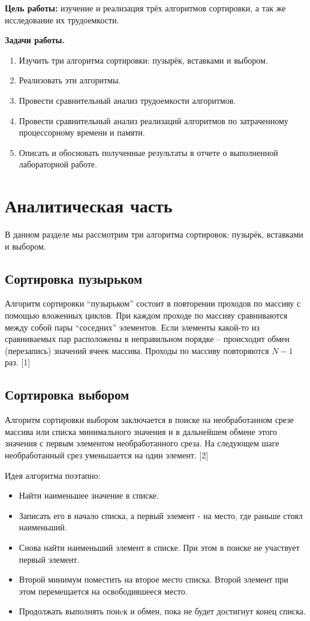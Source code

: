 \documentclass[a4paper,14pt, unknownkeysallowed]{extreport}
\begin{document}
\textbf{Цель работы:} изучение и реализация трёх алгоритмов сортировки, а так же исследование их трудоемкости. \newline

\textbf{Задачи работы.}
\begin{enumerate}
	\item Изучить три алгоритма сортировки: пузырёк, вставками и выбором.
    \item Реализовать эти алгоритмы.
    \item Провести сравнительный анализ трудоемкости алгоритмов.
    \item Провести сравнительный анализ реализаций алгоритмов по затраченному процессорному времени и памяти.
	\item Описать и обосновать полученные результаты в отчете о выполненной лабораторной работе.
\end{enumerate}







\chapter{Аналитическая часть}
В данном разделе мы рассмотрим три алгоритма сортировок: пузырёк, вставками и выбором.

\section{Сортировка пузырьком}

Алгоритм сортировки “пузырьком” состоит в повторении проходов по массиву с помощью вложенных циклов. При каждом проходе по массиву сравниваются между собой пары “соседних” элементов. Если элементы какой-то из сравниваемых пар расположены в неправильном порядке – происходит обмен (перезапись) значений ячеек массива. Проходы по массиву повторяются $N-1$ раз. [1]

\section{Сортировка выбором}

Алгоритм сортировки выбором заключается в поиске на необработанном срезе массива или списка минимального значения и в дальнейшем обмене этого значения с первым элементом необработанного среза. На следующем шаге необработанный срез уменьшается на один элемент. [2]

Идея алгоритма поэтапно:
\begin{itemize}
    \item Найти наименьшее значение в списке.
    \item Записать его в начало списка, а первый элемент - на место, где раньше стоял наименьший.
    \item Снова найти наименьший элемент в списке. При этом в поиске не участвует первый элемент.
    \item Второй минимум поместить на второе место списка. Второй элемент при этом перемещается на освободившееся место.
    \item Продолжать выполнять поиcк и обмен, пока не будет достигнут конец списка.
\end{itemize}
\end{document}
